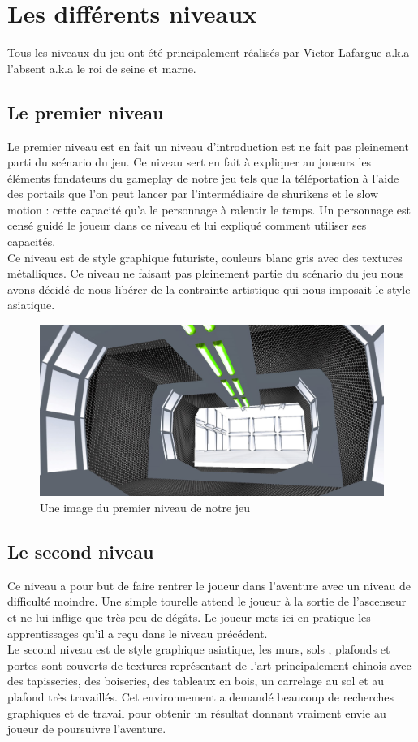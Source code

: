 \documentclass[12pt]{article}
\begin{document}
\section{Les différents niveaux}

Tous les niveaux du jeu ont été principalement réalisés par Victor Lafargue a.k.a l'absent a.k.a le roi de seine et marne.

\subsection{Le premier niveau}

Le premier niveau est en fait un niveau d'introduction est ne fait pas pleinement parti du scénario du jeu. Ce niveau sert en fait à expliquer au joueurs les éléments fondateurs du gameplay de notre jeu tels que la téléportation à l'aide des portails que l'on peut lancer par l'intermédiaire de  shurikens et le slow motion : cette capacité qu'a le personnage à ralentir le temps. Un personnage est censé guidé le joueur dans ce niveau et lui expliqué comment utiliser ses capacités.\\
Ce niveau est de style graphique futuriste, couleurs blanc gris avec des textures métalliques. Ce niveau ne faisant pas pleinement partie du scénario du jeu nous avons décidé de nous libérer de la contrainte artistique qui nous imposait le style asiatique.

\begin{figure}[h]
\centering
\includegraphics[scale=0.2]{1.jpg}
\caption{Une image du premier niveau de notre jeu}
\end{figure}

\subsection{Le second niveau}

Ce niveau a pour but de faire rentrer le joueur dans l'aventure avec un niveau de difficulté moindre. Une simple tourelle attend le joueur à la sortie de l'ascenseur et ne lui inflige que très peu de dégâts. Le joueur mets ici en pratique les apprentissages qu'il a reçu dans le niveau précédent.\\
Le second niveau est de style graphique asiatique, les murs, sols , plafonds et portes sont couverts de textures représentant de l'art principalement chinois avec des tapisseries, des boiseries, des tableaux en bois, un carrelage au sol et au plafond très travaillés. Cet environnement a demandé beaucoup de recherches graphiques et de travail pour obtenir un résultat donnant vraiment envie au joueur de poursuivre l'aventure.
\end{document}
